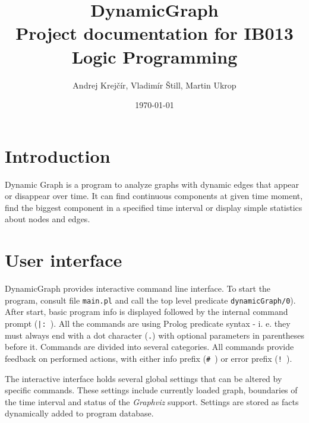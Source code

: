 \documentclass[11pt, a4paper]{article}
\newcommand{\pl}[1]{\texttt{#1}} %
\theoremstyle{plain}
\theoremstyle{definition}
\theoremstyle{remark}
\newcommand{\gv}{\textit{Graphviz}}
\begin{document}
\title{{\Huge DynamicGraph} \\ {\large Project documentation for IB013 Logic Programming} }
\author{Andrej Krejčír, Vladimír Štill, Martin Ukrop}
\date{\today}
\maketitle

\section{Introduction}

Dynamic Graph is a program to analyze graphs with dynamic edges that appear or disappear over time. It can find continuous components at given time moment, find the biggest component in a specified time interval or display simple statistics about nodes and edges.

\section{User interface}

DynamicGraph provides interactive command line interface. To start the program, consult file \pl{main.pl} and
call the top level predicate \pl{dynamicGraph/0}).
After start, basic program info is displayed followed by the internal command prompt (\pl{|: }).
All the commands are using Prolog predicate syntax - i. e. they must always end with a dot character (\pl{.}) 
with optional parameters in parentheses before it. Commands are divided into several categories.
All commands provide feedback on performed actions, with either info prefix (\pl{\# }) or error prefix (\pl{! }).

The interactive interface holds several global settings that can be altered by specific commands. 
These settings include currently loaded graph, boundaries of the time interval and status of the \gv{} support. 
Settings are stored as facts dynamically added to program database.
\end{document}
